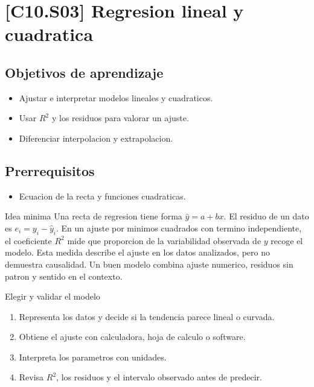 \section{[C10.S03] Regresion lineal y cuadratica}

\subsection*{Objetivos de aprendizaje}
\begin{itemize}
  \item Ajustar e interpretar modelos lineales y cuadraticos.
  \item Usar \(R^2\) y los residuos para valorar un ajuste.
  \item Diferenciar interpolacion y extrapolacion.
\end{itemize}

\subsection*{Prerrequisitos}
\begin{itemize}
  \item Ecuacion de la recta y funciones cuadraticas.
\end{itemize}

\begin{theorybox}{Idea minima}
Una recta de regresion tiene forma \(\hat y=a+bx\). El residuo de un dato es
\(e_i=y_i-\hat y_i\). En un ajuste por minimos cuadrados con termino independiente, el
coeficiente \(R^2\) mide que proporcion de la variabilidad observada de \(y\) recoge el modelo.
Esta medida describe el ajuste en los datos analizados, pero no demuestra causalidad. Un buen
modelo combina ajuste numerico, residuos sin patron y sentido en el contexto.
\end{theorybox}

\begin{methodbox}{Elegir y validar el modelo}
\begin{enumerate}
  \item Representa los datos y decide si la tendencia parece lineal o curvada.
  \item Obtiene el ajuste con calculadora, hoja de calculo o software.
  \item Interpreta los parametros con unidades.
  \item Revisa \(R^2\), los residuos y el intervalo observado antes de predecir.
\end{enumerate}
\end{methodbox}

